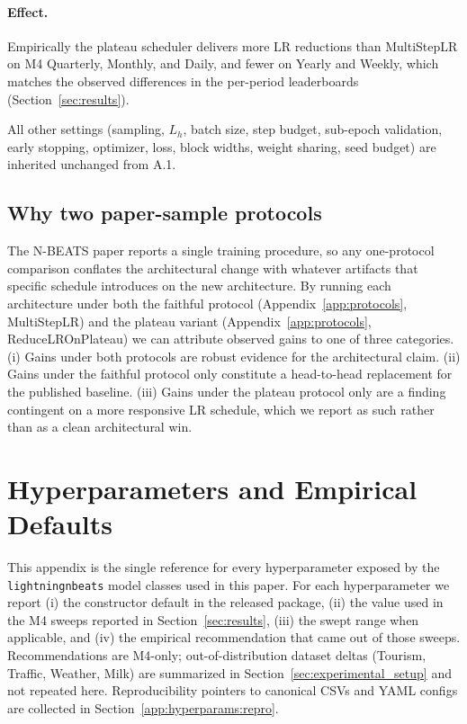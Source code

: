 \documentclass[11pt,a4paper]{article}
\begin{document}
\paragraph{Effect.} Empirically the plateau scheduler delivers more LR reductions than MultiStepLR on M4 Quarterly, Monthly, and Daily, and fewer on Yearly and Weekly, which matches the observed differences in the per-period leaderboards (Section~\ref{sec:results}).

All other settings (sampling, $L_h$, batch size, step budget, sub-epoch validation, early stopping, optimizer, loss, block widths, weight sharing, seed budget) are inherited unchanged from A.1.

\subsection{Why two paper-sample protocols}

The N-BEATS paper reports a single training procedure, so any one-protocol comparison conflates the architectural change with whatever artifacts that specific schedule introduces on the new architecture. By running each architecture under both the faithful protocol (Appendix~\ref{app:protocols}, MultiStepLR) and the plateau variant (Appendix~\ref{app:protocols}, ReduceLROnPlateau) we can attribute observed gains to one of three categories. (i) Gains under both protocols are robust evidence for the architectural claim. (ii) Gains under the faithful protocol only constitute a head-to-head replacement for the published baseline. (iii) Gains under the plateau protocol only are a finding contingent on a more responsive LR schedule, which we report as such rather than as a clean architectural win.


\section{Hyperparameters and Empirical Defaults}
\label{app:hyperparams}

This appendix is the single reference for every hyperparameter exposed by the \texttt{lightningnbeats} model classes used in this paper. For each hyperparameter we report (i) the constructor default in the released package, (ii) the value used in the M4 sweeps reported in Section~\ref{sec:results}, (iii) the swept range when applicable, and (iv) the empirical recommendation that came out of those sweeps. Recommendations are M4-only; out-of-distribution dataset deltas (Tourism, Traffic, Weather, Milk) are summarized in Section~\ref{sec:experimental_setup} and not repeated here. Reproducibility pointers to canonical CSVs and YAML configs are collected in Section~\ref{app:hyperparams:repro}.
\end{document}
